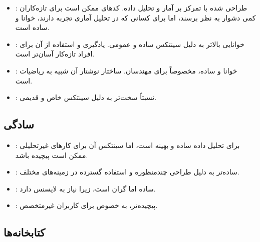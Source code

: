 \documentclass[11pt, a4paper, oneside]{book}
\begin{document}
				\begin{itemize}
					
					\item {\large {}}:
					{\normalsize طراحی شده با تمرکز بر آمار و تحلیل داده. کدهای  ممکن است برای تازه‌کاران کمی دشوار به نظر برسند، اما برای کسانی که در تحلیل آماری تجربه دارند، خوانا و ساده است.}
					
					\item {\large {}}:
					{\normalsize خوانایی بالاتر به دلیل سینتکس ساده و عمومی. یادگیری و استفاده از آن برای افراد تازه‌کار آسان‌تر است.}
					
					\item {\large {}}:
					{\normalsize خوانا و ساده، مخصوصاً برای مهندسان. ساختار نوشتار آن شبیه به ریاضیات است.}
					
					\item {\large {}}:
					{\normalsize نسبتاً سخت‌تر به دلیل سینتکس خاص و قدیمی.}
					
				\end{itemize}
		
			\subsection{سادگی}
			
				\begin{itemize}
					
					\item {\large {}}:
					{\normalsize برای تحلیل داده ساده و بهینه است، اما سینتکس آن برای کارهای غیرتحلیلی ممکن است پیچیده باشد.}
					
					\item {\large {}}:
					{\normalsize ساده‌تر به دلیل طراحی چندمنظوره و استفاده گسترده در زمینه‌های مختلف.}
					
					\item {\large {}}:
					{\normalsize ساده اما گران است، زیرا نیاز به لایسنس دارد.}
					
					\item {\large {}}:
					{\normalsize پیچیده‌تر، به خصوص برای کاربران غیرمتخصص.}
					
				\end{itemize}
				
				
			\subsection{کتابخانه‌ها}
				
\end{document}
